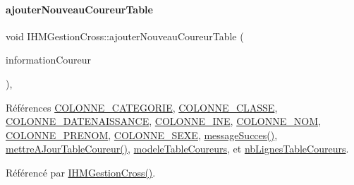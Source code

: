 \paragraph{\texorpdfstring{ajouter\+Nouveau\+Coureur\+Table}{ajouterNouveauCoureurTable}}
{\footnotesize\ttfamily void I\+H\+M\+Gestion\+Cross\+::ajouter\+Nouveau\+Coureur\+Table (\begin{DoxyParamCaption}\item[{Q\+String\+List}]{information\+Coureur }\end{DoxyParamCaption})\hspace{0.3cm}{\ttfamily [private]}, {\ttfamily [slot]}}



Références \hyperlink{ihmgestioncross_8h_a24ffa4392b8af69a94a6500ec4a60a7e}{C\+O\+L\+O\+N\+N\+E\+\_\+\+C\+A\+T\+E\+G\+O\+R\+IE}, \hyperlink{ihmchronocross_8h_a114680edc01528f77bb689b0a2ca18a2}{C\+O\+L\+O\+N\+N\+E\+\_\+\+C\+L\+A\+S\+SE}, \hyperlink{ihmgestioncross_8h_a985c9028f6a7ed4b42d0e93eeef6c28c}{C\+O\+L\+O\+N\+N\+E\+\_\+\+D\+A\+T\+E\+N\+A\+I\+S\+S\+A\+N\+CE}, \hyperlink{ihmgestioncross_8h_aa8208c9f9fd2ea2418e4b7bb28175f80}{C\+O\+L\+O\+N\+N\+E\+\_\+\+I\+NE}, \hyperlink{ihmchronocross_8h_aeee76385895c145ef5a633e6c6812603}{C\+O\+L\+O\+N\+N\+E\+\_\+\+N\+OM}, \hyperlink{ihmchronocross_8h_a5d6f240d26209cd66db8aa5e1aac62f9}{C\+O\+L\+O\+N\+N\+E\+\_\+\+P\+R\+E\+N\+OM}, \hyperlink{ihmgestioncross_8h_a9ef0920ad9f4f65e80e5d9f8e1b263b2}{C\+O\+L\+O\+N\+N\+E\+\_\+\+S\+E\+XE}, \hyperlink{class_i_h_m_gestion_cross_a71412d0c3e1d059a646c755803077a7b}{message\+Succes()}, \hyperlink{class_i_h_m_gestion_cross_a53c84315d723d75ad7b4a7d4c317efc5}{mettre\+A\+Jour\+Table\+Coureur()}, \hyperlink{class_i_h_m_gestion_cross_ad9560c4804694dbbf969de5f6f56eb30}{modele\+Table\+Coureurs}, et \hyperlink{class_i_h_m_gestion_cross_a0f4f5886077b1c5cbfa9cc0680d0380f}{nb\+Lignes\+Table\+Coureurs}.



Référencé par \hyperlink{class_i_h_m_gestion_cross_a2c62fd83326a87456a403f46acc408c8}{I\+H\+M\+Gestion\+Cross()}.


